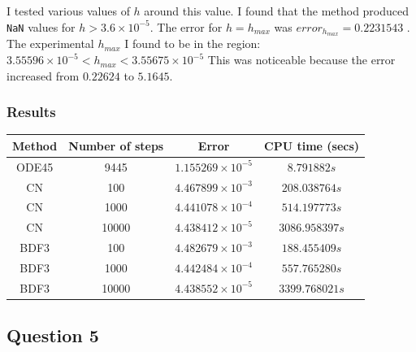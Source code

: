 \documentclass[a4paper, 11pt]{article}
\begin{document}
			I tested various values of $h$ around this value. 
			I found that the method produced \texttt{NaN} values for $h > 3.6\times 10^{-5} $.
			The error for $ h = h_{max}$ was $error_{h_{max}} = 0.2231543$ .
			The experimental $h_{max}$ I found to be in the region: $ 3.55596 \times 10^{-5} < h_{max} < 3.55675 \times 10^{-5}$
			This was noticeable because the error increased from $ 0.22624 $ to $ 5.1645 $.
			
			
	\subsubsection*{Results}
		\begin{table}[H]
			\centering
			\begin{tabular}{c|c|c|c}
				\textbf{Method} & \textbf{Number of steps} 	& \textbf{Error}  				& \textbf{CPU time (secs)}  	\\ \hline
				ODE45 			& 9445 						& $ 1.155269\times 10^{-5} $ 	& $ 8.791882 s $ 	\\ \hline 
				CN 				& 100 						& $ 4.467899\times 10^{-3} $ 	& $ 208.038764 s $ 				\\ \hline
				CN 				& 1000 						& $ 4.441078\times 10^{-4} $ 	& $ 514.197773 s $ 				\\ \hline
				CN 				& 10000 					& $ 4.438412\times 10^{-5} $ 	& $ 3086.958397 s $				\\ \hline
				BDF3 			& 100				 		& $ 4.482679\times 10^{-3} $ 	& $ 188.455409 s $ 				\\ \hline
				BDF3 			& 1000						& $ 4.442484\times 10^{-4} $ 	& $ 557.765280 s $ 				\\ \hline
				BDF3 			& 10000 					& $ 4.438552\times 10^{-5} $ 	& $ 3399.768021 s $ 			\\ \hline
			\end{tabular}
		\end{table}

	
	\subsection*{Question 5}
	
\end{document}

